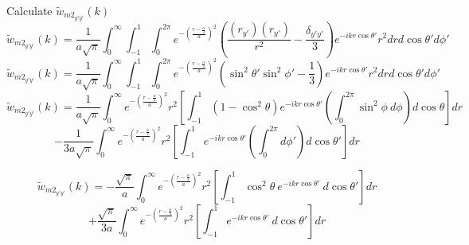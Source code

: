\documentclass[letterpaper,twocolumn,amsmath,amssymb,prb]{revtex4-1}
\begin{document}
\begin{widetext}
Calculate $\widetilde{w}_{{m2}_{y'y'}}(k)$ 
\begin{equation}{\widetilde{w}_{{m2}_{y'y'}}(k)=\frac{1}{a\sqrt{\pi}}\int_{0}^{\infty}\int_{-1}^{1}\int_{0}^{2\pi}e^{-\left(\frac{r-\frac{\alpha}{2}}{a}\right)^2}\left(\frac{(r_{y'})(r_{y'})}{r^2}-\frac{\delta_{y'y'}}{3}\right)e^{-ikr\cos\theta'}r^2d{r}d{\cos\theta'}d{\phi'}}\end{equation}
\begin{equation}{\widetilde{w}_{{m2}_{y'y'}}(k)=\frac{1}{a\sqrt{\pi}}\int_{0}^{\infty}\int_{-1}^{1}\int_{0}^{2\pi}e^{-\left(\frac{r-\frac{\alpha}{2}}{a}\right)^2}\left(\sin^2\theta'\sin^2\phi'-\frac{1}{3}\right)e^{-ikr\cos\theta'}r^2d{r}d{\cos\theta'}d{\phi'}}\end{equation}
\[{}\]
\begin{displaymath}{\widetilde{w}_{{m2}_{y'y'}}(k)=\frac{1}{a\sqrt{\pi}}\int_{0}^{\infty}e^{-\left(\frac{r-\frac{\alpha}{2}}{a}\right)^2}r^2\left[\int_{-1}^{1}\left(1-\cos^2\theta\right)e^{-ikr\cos\theta'}\left(\int_{0}^{2\pi}\sin^2\phi~d{\phi}\right)d{\cos\theta}\right]d{r}}\end{displaymath} 
\begin{equation}{-\frac{1}{3a\sqrt{\pi}}\int_{0}^{\infty}e^{-\left(\frac{r-\frac{\alpha}{2}}{a}\right)^2}r^2\left[\int_{-1}^{1}e^{-ikr\cos\theta'}\left(\int_{0}^{2\pi}d{\phi'}\right)d{\cos\theta'}\right]d{r}}\end{equation}

\color{blue}
\begin{displaymath}{\widetilde{w}_{{m2}_{y'y'}}(k)=-\frac{\sqrt{\pi}}{a}\int_{0}^{\infty}e^{-\left(\frac{r-\frac{\alpha}{2}}{a}\right)^2}r^2\left[\int_{-1}^{1}\cos^2\theta~e^{-ikr\cos\theta'}~d{\cos\theta'}\right]d{r}}\end{displaymath} 
\begin{equation}{+\frac{\sqrt{\pi}}{3a}\int_{0}^{\infty}e^{-\left(\frac{r-\frac{\alpha}{2}}{a}\right)^2}r^2\left[\int_{-1}^{1}e^{-ikr\cos\theta'}~d{\cos\theta'}\right]d{r}}\end{equation}
\color{black} 
\[{}\]



\end{widetext}
\end{document}
